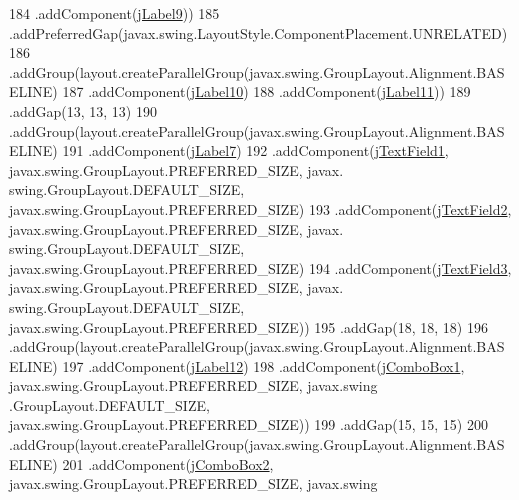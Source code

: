 \begin{DoxyCode}
184                     .addComponent(\mbox{\hyperlink{class_interfaz_package_1_1_verificar_libro_ad47175a24ea896af5265b3635c95852e}{jLabel9}}))
185                 .addPreferredGap(javax.swing.LayoutStyle.ComponentPlacement.UNRELATED)
186                 .addGroup(layout.createParallelGroup(javax.swing.GroupLayout.Alignment.BASELINE)
187                     .addComponent(\mbox{\hyperlink{class_interfaz_package_1_1_verificar_libro_a5107c81876e9d94ddd9d39f3c2102814}{jLabel10}})
188                     .addComponent(\mbox{\hyperlink{class_interfaz_package_1_1_verificar_libro_af2c91db62099138d0bffd934b6e470ed}{jLabel11}}))
189                 .addGap(13, 13, 13)
190                 .addGroup(layout.createParallelGroup(javax.swing.GroupLayout.Alignment.BASELINE)
191                     .addComponent(\mbox{\hyperlink{class_interfaz_package_1_1_verificar_libro_a6e28a406ea8abbcc35d06c8ea648882c}{jLabel7}})
192                     .addComponent(\mbox{\hyperlink{class_interfaz_package_1_1_verificar_libro_a0056a9edc1fada73cb6c0ce0ec712df0}{jTextField1}}, javax.swing.GroupLayout.PREFERRED\_SIZE, javax.
      swing.GroupLayout.DEFAULT\_SIZE, javax.swing.GroupLayout.PREFERRED\_SIZE)
193                     .addComponent(\mbox{\hyperlink{class_interfaz_package_1_1_verificar_libro_a3ad7fdfe6c4d2e934089b98775f6afb9}{jTextField2}}, javax.swing.GroupLayout.PREFERRED\_SIZE, javax.
      swing.GroupLayout.DEFAULT\_SIZE, javax.swing.GroupLayout.PREFERRED\_SIZE)
194                     .addComponent(\mbox{\hyperlink{class_interfaz_package_1_1_verificar_libro_ade0c8f7abc79d9be6cedf3651f98b597}{jTextField3}}, javax.swing.GroupLayout.PREFERRED\_SIZE, javax.
      swing.GroupLayout.DEFAULT\_SIZE, javax.swing.GroupLayout.PREFERRED\_SIZE))
195                 .addGap(18, 18, 18)
196                 .addGroup(layout.createParallelGroup(javax.swing.GroupLayout.Alignment.BASELINE)
197                     .addComponent(\mbox{\hyperlink{class_interfaz_package_1_1_verificar_libro_abc6a3ed061a0f7f051470750826cda02}{jLabel12}})
198                     .addComponent(\mbox{\hyperlink{class_interfaz_package_1_1_verificar_libro_a5f8fd3453828fec1a8baafb3788ee5c6}{jComboBox1}}, javax.swing.GroupLayout.PREFERRED\_SIZE, javax.swing
      .GroupLayout.DEFAULT\_SIZE, javax.swing.GroupLayout.PREFERRED\_SIZE))
199                 .addGap(15, 15, 15)
200                 .addGroup(layout.createParallelGroup(javax.swing.GroupLayout.Alignment.BASELINE)
201                     .addComponent(\mbox{\hyperlink{class_interfaz_package_1_1_verificar_libro_a6e3256102994e7764c50c7a37aebc859}{jComboBox2}}, javax.swing.GroupLayout.PREFERRED\_SIZE, javax.swing

\end{DoxyCode}
